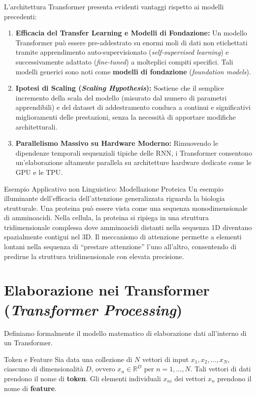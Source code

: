 L'architettura Transformer presenta evidenti vantaggi rispetto ai modelli precedenti:
\begin{enumerate}
    \item \textbf{Efficacia del Transfer Learning e Modelli di Fondazione:} Un modello Transformer può essere pre-addestrato su enormi moli di dati non etichettati tramite apprendimento auto-supervisionato (\textit{self-supervised learning}) e successivamente adattato (\textit{fine-tuned}) a molteplici compiti specifici. Tali modelli generici sono noti come \textbf{modelli di fondazione} (\textit{foundation models}).
    \item \textbf{Ipotesi di Scaling (\textit{Scaling Hypothesis}):} Sostiene che il semplice incremento della scala del modello (misurato dal numero di parametri apprendibili) e del dataset di addestramento conduca a continui e significativi miglioramenti delle prestazioni, senza la necessità di apportare modifiche architetturali.
    \item \textbf{Parallelismo Massivo su Hardware Moderno:} Rimuovendo le dipendenze temporali sequenziali tipiche delle RNN, i Transformer consentono un'elaborazione altamente parallela su architetture hardware dedicate come le GPU e le TPU.
\end{enumerate}

\begin{definition}{Esempio Applicativo non Linguistico: Modellazione Proteica}
Un esempio illuminante dell'efficacia dell'attenzione generalizzata riguarda la biologia strutturale. Una proteina può essere vista come una sequenza monodimensionale di amminoacidi. Nella cellula, la proteina si ripiega in una struttura tridimensionale complessa dove amminoacidi distanti nella sequenza 1D diventano spazialmente contigui nel 3D. Il meccanismo di attenzione permette a elementi lontani nella sequenza di ``prestare attenzione'' l'uno all'altro, consentendo di predirne la struttura tridimensionale con elevata precisione.
\end{definition}

\section{Elaborazione nei Transformer (\textit{Transformer Processing})}
Definiamo formalmente il modello matematico di elaborazione dati all'interno di un Transformer.

\begin{definition}{Token e Feature}
Sia data una collezione di $N$ vettori di input $x_1, x_2, \dots, x_N$, ciascuno di dimensionalità $D$, ovvero $x_n \in \mathbb{R}^D$ per $n = 1, \dots, N$. Tali vettori di dati prendono il nome di \textbf{token}. Gli elementi individuali $x_{ni}$ dei vettori $x_n$ prendono il nome di \textbf{feature}.
\end{definition}

